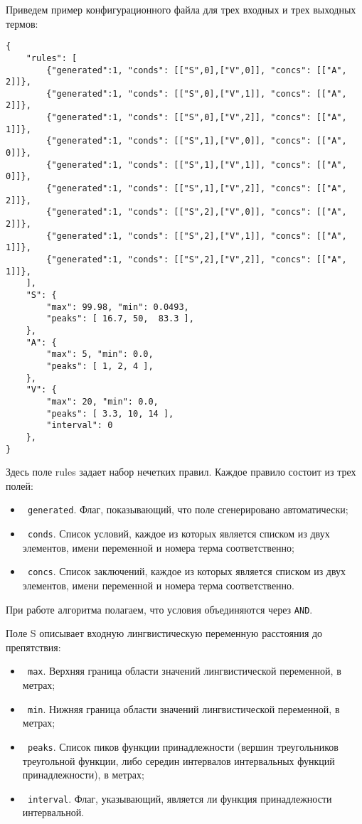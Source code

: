 Приведем пример конфигурационного файла для трех входных и трех выходных термов:
\begin{lstlisting}[style=pythonstyle,caption={  }, label=lst:func:1]
{
    "rules": [
        {"generated":1, "conds": [["S",0],["V",0]], "concs": [["A", 2]]},
        {"generated":1, "conds": [["S",0],["V",1]], "concs": [["A", 2]]},
        {"generated":1, "conds": [["S",0],["V",2]], "concs": [["A", 1]]},
        {"generated":1, "conds": [["S",1],["V",0]], "concs": [["A", 0]]},
        {"generated":1, "conds": [["S",1],["V",1]], "concs": [["A", 0]]},
        {"generated":1, "conds": [["S",1],["V",2]], "concs": [["A", 2]]},
        {"generated":1, "conds": [["S",2],["V",0]], "concs": [["A", 2]]},
        {"generated":1, "conds": [["S",2],["V",1]], "concs": [["A", 1]]},
        {"generated":1, "conds": [["S",2],["V",2]], "concs": [["A", 1]]},
    ],
    "S": {
        "max": 99.98, "min": 0.0493,
        "peaks": [ 16.7, 50,  83.3 ],
    },
    "A": {
        "max": 5, "min": 0.0,
        "peaks": [ 1, 2, 4 ],
    },
    "V": {
        "max": 20, "min": 0.0,
        "peaks": [ 3.3, 10, 14 ],
        "interval": 0
    },
}
\end{lstlisting}

Здесь поле rules задает набор нечетких правил. Каждое правило состоит из трех полей:
\begin{itemize}
	\item \lstinline! generated!. Флаг, показывающий, что поле сгенерировано автоматически;
	\item \lstinline! conds!. Список условий, каждое из которых является списком из двух элементов, имени переменной и номера терма соответственно;
	\item \lstinline! concs!. Список заключений, каждое из которых является списком из двух элементов, имени переменной и номера терма соответственно.
\end{itemize}

При работе алгоритма полагаем, что условия объединяются через \lstinline!AND!.

Поле S описывает входную лингвистическую переменную расстояния до препятствия:
\begin{itemize}
	\item \lstinline! max!. Верхняя граница области значений лингвистической переменной, в метрах;
	\item \lstinline! min!. Нижняя граница области значений лингвистической переменной, в метрах;
	\item \lstinline! peaks!. Список пиков функции принадлежности (вершин треугольников треугольной функции, либо середин интервалов интервальных функций принадлежности), в метрах;
	\item \lstinline! interval!. Флаг, указывающий, является ли функция принадлежности интервальной.
\end{itemize}

